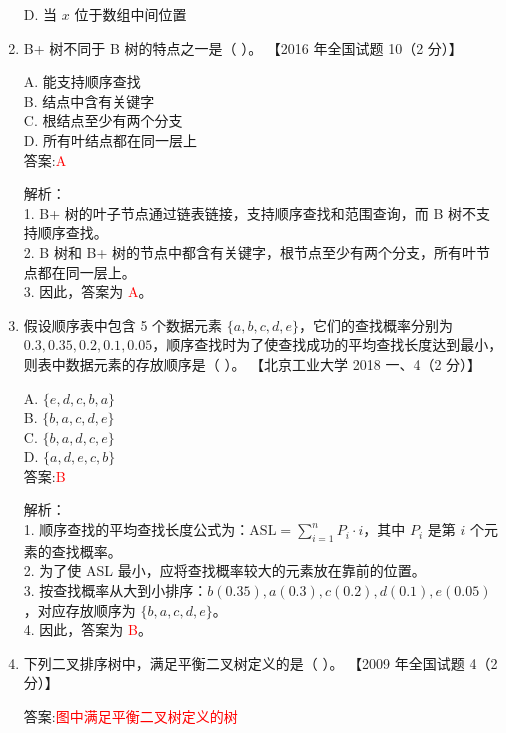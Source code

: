 \documentclass[lang=cn,newtx,10pt,scheme=chinese]{../../../elegantbook}
\begin{document}
\begin{enumerate}
    D. 当 $x$ 位于数组中间位置  

    \item B+ 树不同于 B 树的特点之一是（ ）。  
    【2016 年全国试题 10（2 分）】  

    A. 能支持顺序查找 \\  
    B. 结点中含有关键字 \\  
    C. 根结点至少有两个分支 \\  
    D. 所有叶结点都在同一层上 \\  

    答案:\textcolor{red}{A}

    解析：\\
    1. B+ 树的叶子节点通过链表链接，支持顺序查找和范围查询，而 B 树不支持顺序查找。\\
    2. B 树和 B+ 树的节点中都含有关键字，根节点至少有两个分支，所有叶节点都在同一层上。\\
    3. 因此，答案为 \textcolor{red}{A}。\\

\item 假设顺序表中包含 5 个数据元素 $\{a, b, c, d, e\}$，它们的查找概率分别为 $0.3, 0.35, 0.2, 0.1, 0.05$，顺序查找时为了使查找成功的平均查找长度达到最小，则表中数据元素的存放顺序是（ ）。  
    【北京工业大学 2018 一、4（2 分）】  

    A. $\{e, d, c, b, a\}$ \\  
    B. $\{b, a, c, d, e\}$ \\  
    C. $\{b, a, d, c, e\}$ \\  
    D. $\{a, d, e, c, b\}$ \\  

    答案:\textcolor{red}{B}

    解析：\\
    1. 顺序查找的平均查找长度公式为：$\text{ASL} = \sum_{i=1}^n P_i \cdot i$，其中 $P_i$ 是第 $i$ 个元素的查找概率。\\
    2. 为了使 ASL 最小，应将查找概率较大的元素放在靠前的位置。\\
    3. 按查找概率从大到小排序：$b(0.35), a(0.3), c(0.2), d(0.1), e(0.05)$，对应存放顺序为 $\{b, a, c, d, e\}$。\\
    4. 因此，答案为 \textcolor{red}{B}。\\

\item 下列二叉排序树中，满足平衡二叉树定义的是（ ）。  
    【2009 年全国试题 4（2 分）】  

    答案:\textcolor{red}{图中满足平衡二叉树定义的树}


\end{enumerate}
\end{document}
